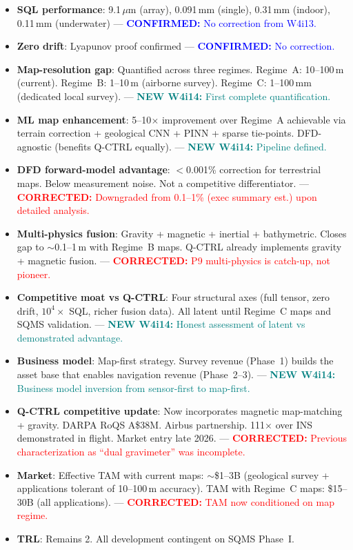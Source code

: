 \documentclass[11pt]{article}
\theoremstyle{definition}
\theoremstyle{remark}
\newcommand{\confirmed}[1]{\textcolor{blue}{\textbf{CONFIRMED:} #1}}
\newcommand{\corrected}[1]{\textcolor{red}{\textbf{CORRECTED:} #1}}
\newcommand{\newfinding}[1]{\textcolor{teal}{\textbf{NEW W4i14:} #1}}
\begin{document}
\begin{tcolorbox}[colback=green!5!white, colframe=green!40!black,
  title=\textbf{P9 Status: ALIVE --- Strategy Refined, Honest Negatives Deepened}]
\begin{itemize}[nosep]
\item \textbf{SQL performance}: 9.1\,$\mu$m (array), 0.091\,mm (single),
  0.31\,mm (indoor), 0.11\,mm (underwater) ---
  \confirmed{No correction from W4i13.}
\item \textbf{Zero drift}: Lyapunov proof confirmed ---
  \confirmed{No correction.}
\item \textbf{Map-resolution gap}: Quantified across three regimes.
  Regime~A: 10--100\,m (current). Regime~B: 1--10\,m (airborne survey).
  Regime~C: 1--100\,mm (dedicated local survey). ---
  \newfinding{First complete quantification.}
\item \textbf{ML map enhancement}: 5--10$\times$ improvement over
  Regime~A achievable via terrain correction + geological CNN + PINN +
  sparse tie-points. DFD-agnostic (benefits Q-CTRL equally). ---
  \newfinding{Pipeline defined.}
\item \textbf{DFD forward-model advantage}: $<$0.001\% correction
  for terrestrial maps. Below measurement noise. Not a competitive
  differentiator. ---
  \corrected{Downgraded from 0.1--1\% (exec summary est.) upon
  detailed analysis.}
\item \textbf{Multi-physics fusion}: Gravity + magnetic + inertial +
  bathymetric. Closes gap to $\sim$0.1--1\,m with Regime~B maps.
  Q-CTRL already implements gravity + magnetic fusion. ---
  \corrected{P9 multi-physics is catch-up, not pioneer.}
\item \textbf{Competitive moat vs Q-CTRL}: Four structural axes
  (full tensor, zero drift, $10^4\times$ SQL, richer fusion data).
  All latent until Regime~C maps and SQMS validation. ---
  \newfinding{Honest assessment of latent vs demonstrated advantage.}
\item \textbf{Business model}: Map-first strategy. Survey revenue
  (Phase~1) builds the asset base that enables navigation revenue
  (Phase~2--3). ---
  \newfinding{Business model inversion from sensor-first to map-first.}
\item \textbf{Q-CTRL competitive update}: Now incorporates magnetic
  map-matching + gravity. DARPA RoQS A\$38M. Airbus partnership.
  111$\times$ over INS demonstrated in flight. Market entry late 2026. ---
  \corrected{Previous characterization as ``dual gravimeter'' was
  incomplete.}
\item \textbf{Market}: Effective TAM with current maps: $\sim$\$1--3B
  (geological survey + applications tolerant of 10--100\,m accuracy).
  TAM with Regime~C maps: \$15--30B (all applications). ---
  \corrected{TAM now conditioned on map regime.}
\item \textbf{TRL}: Remains 2. All development contingent on SQMS
  Phase~I.
\end{itemize}
\end{tcolorbox}
\end{document}
